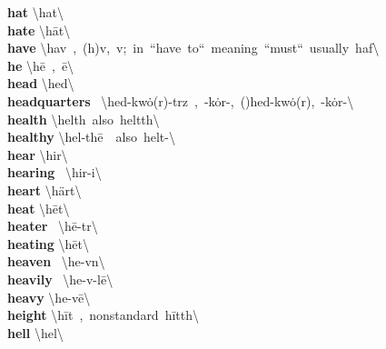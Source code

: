 \documentclass[10pt,a4paper]{article}
\begin{document}
\begin{multicols}{2}
\textbf{ hat }\quad \textbackslash \textprimstress hat\textbackslash \\
\textbf{ hate }\quad \textbackslash \textprimstress h\={a}t\textbackslash \\
\textbf{ have }\quad \textbackslash \textprimstress hav\ ,\ (h)\textschwa v,\ v;\ in\ ``have\ to``\ meaning\ ``must``\ usually\ \textprimstress haf\textbackslash \\
\textbf{ he }\quad \textbackslash \textprimstress h\={e}\ ,\ \={e}\textbackslash \\
\textbf{ head }\quad \textbackslash \textprimstress hed\textbackslash \\
\textbf{ headquarters }\quad \ \textbackslash \textprimstress hed-\textsecstress kw\.{o}(r)-t\textschwa rz\ ,\ -\textsecstress k\.{o}r-,\ (\textprimstress )hed-\textprimstress kw\.{o}(r),\ -\textprimstress k\.{o}r-\textbackslash \\
\textbf{ health }\quad \textbackslash \textprimstress helth\ also\ \textprimstress heltth\textbackslash \\
\textbf{ healthy }\quad \textbackslash \textprimstress hel-th\={e}\ \ also\ \textprimstress helt-\textbackslash \\
\textbf{ hear }\quad \textbackslash \textprimstress hir\textbackslash \\
\textbf{ hearing }\quad \ \textbackslash \textprimstress hir-i\engma \textbackslash \\
\textbf{ heart }\quad \textbackslash \textprimstress h\"{a}rt\textbackslash \\
\textbf{ heat }\quad \textbackslash \textprimstress h\={e}t\textbackslash \\
\textbf{ heater }\quad \ \textbackslash \textprimstress h\={e}-t\textschwa r\textbackslash \\
\textbf{ heating }\quad \textbackslash \textprimstress h\={e}t\textbackslash \\
\textbf{ heaven }\quad \ \textbackslash \textprimstress he-v\textschwa n\textbackslash \\
\textbf{ heavily }\quad \ \textbackslash \textprimstress he-v\textschwa -l\={e}\textbackslash \\
\textbf{ heavy }\quad \textbackslash \textprimstress he-v\={e}\textbackslash \\
\textbf{ height }\quad \textbackslash \textprimstress h\={i}t\ ,\ nonstandard\ \textprimstress h\={i}tth\textbackslash \\
\textbf{ hell }\quad \textbackslash \textprimstress hel\textbackslash \\

\end{multicols}
\end{document}
